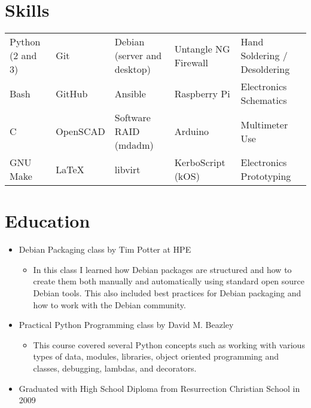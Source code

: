 \documentclass[letterpaper,10pt]{article}
\begin{document}

    \section*{Skills}
        \begin{tabular}{lllll}
            Python (2 and 3) & Git      & Debian (server and desktop) & Untangle NG Firewall & Hand Soldering / Desoldering \\
            Bash             & GitHub   & Ansible                     & Raspberry Pi         & Electronics Schematics \\
            C                & OpenSCAD & Software RAID (mdadm)       & Arduino              & Multimeter Use \\
            GNU Make         & \LaTeX   & libvirt                     & KerboScript (kOS)    & Electronics Prototyping \\
        \end{tabular}

    \section*{Education}
        \begin{itemize}
            \item Debian Packaging class by Tim Potter at HPE
            \begin{itemize}
                \item In this class I learned how Debian packages are structured and how to create them both manually and automatically using standard open source Debian tools. This also included best practices for Debian packaging and how to work with the Debian community.
            \end{itemize}
            \item Practical Python Programming class by David M. Beazley
            \begin{itemize}
                \item This course covered several Python concepts such as working with various types of data, modules, libraries, object oriented programming and classes, debugging, lambdas, and decorators.
            \end{itemize}
            \item Graduated with High School Diploma from Resurrection Christian School in 2009
        \end{itemize}
\end{document}
